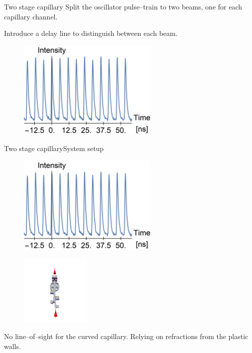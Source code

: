 \documentclass[draft]{beamer}
\begin{document}
  \begin{frame}{Two stage capillary}
    Split the oscillator pulse--train to two beams, one for each capillary channel.
    
    Introduce a delay line to distinguish between each beam.
    \begin{figure}
      \includegraphics[width=0.6\textwidth]{figures/results/2stageCapillary/double.png}
    \end{figure}
  \end{frame}
  \begin{frame}{Two stage capillary}{System setup}
    \begin{figure}
      \includegraphics[width=0.6\textwidth]{figures/results/2stageCapillary/double.png}
    \end{figure}
    \begin{figure}
      \includegraphics[width=0.3\textwidth]{figures/results/2stageCapillary/line-of-sight.png}
    \end{figure}
    No line--of--sight for the curved capillary. Relying on refractions from the plastic walls.
  \end{frame}
\end{document}
